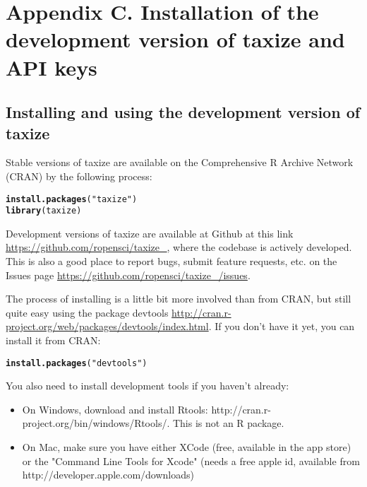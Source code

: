 \documentclass[letterpaper,superscriptaddress,showkeys,longbibliography]{revtex4-1}\usepackage[]{graphicx}\usepackage[]{color}
\makeatletter
\newcommand{\hlstr}[1]{\textcolor[rgb]{0.192,0.494,0.8}{#1}}%
\newcommand{\hlstd}[1]{\textcolor[rgb]{0.345,0.345,0.345}{#1}}%
\newcommand{\hlkwd}[1]{\textcolor[rgb]{0.737,0.353,0.396}{\textbf{#1}}}%
\newenvironment{kframe}{%
 \def\at@end@of@kframe{}%
 \ifinner\ifhmode%
  \def\at@end@of@kframe{\end{minipage}}%
  \begin{minipage}{\columnwidth}%
 \fi\fi%
 \def\FrameCommand##1{\hskip\@totalleftmargin \hskip-\fboxsep
 \colorbox{shadecolor}{##1}\hskip-\fboxsep
     \hskip-\linewidth \hskip-\@totalleftmargin \hskip\columnwidth}%
 \MakeFramed {\advance\hsize-\width
   \@totalleftmargin\z@ \linewidth\hsize
   \@setminipage}}%
 {\par\unskip\endMakeFramed%
 \at@end@of@kframe}
\newenvironment{knitrout}{}{} %
\makeatother
\begin{document}
\section*{Appendix C. Installation of the development version of taxize and API keys} 

\subsection*{Installing and using the development version of taxize}

Stable versions of taxize are available on the Comprehensive R Archive Network (CRAN) by the following process: 

\begin{knitrout}
\color{fgcolor}\begin{kframe}
\begin{alltt}
\hlkwd{install.packages}\hlstd{(}\hlstr{"taxize"}\hlstd{)}
\hlkwd{library}\hlstd{(taxize)}
\end{alltt}
\end{kframe}
\end{knitrout}


Development versions of taxize are available at Github at this link \url{https://github.com/ropensci/taxize_}, where the codebase is actively developed. This is also a good place to report bugs, submit feature requests, etc. on the Issues page \url{https://github.com/ropensci/taxize_/issues}. 

The process of installing is a little bit more involved than from CRAN, but still quite easy using the package devtools \url{http://cran.r-project.org/web/packages/devtools/index.html}.
If you don't have it yet, you can install it from CRAN:

\begin{knitrout}
\color{fgcolor}\begin{kframe}
\begin{alltt}
\hlkwd{install.packages}\hlstd{(}\hlstr{"devtools"}\hlstd{)}
\end{alltt}
\end{kframe}
\end{knitrout}


You also need to install development tools if you haven't already:

\begin{itemize}
  \item On Windows, download and install Rtools: http://cran.r-project.org/bin/windows/Rtools/. This is not an R package.
  \item On Mac, make sure you have either XCode (free, available in the app store) or the "Command Line Tools for Xcode" (needs a free apple id, available from http://developer.apple.com/downloads)
\end{itemize}
\end{document}
